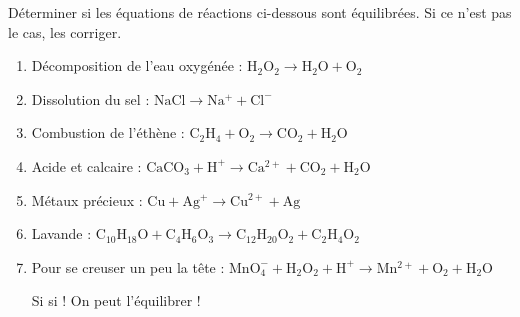 \documentclass[12pt,a4paper,fleqn]{article}
\begin{document}
\normalem %

Déterminer si les équations de réactions ci-dessous sont équilibrées.
Si ce n'est pas le cas, les corriger.

\begin{enumerate}
\item Décomposition de l'eau oxygénée : $ \mathrm{H_2O_2 \rightarrow H_2O + O_2} $
\item Dissolution du sel : $\mathrm{NaCl \rightarrow Na^+ + Cl^-} $
\item Combustion de l'éthène : $\mathrm{C_2H_4 + O_2 \rightarrow CO_2 + H_2O}$
\item Acide et calcaire : $\mathrm{CaCO_3 + H^+ \rightarrow Ca^{2+} + CO_2 + H_2O}$
\item Métaux précieux : $\mathrm{Cu + Ag^+ \rightarrow Cu^{2+} + Ag}$
\item Lavande : $\mathrm{C_{10}H_{18}O + C_4H_6O_3 \rightarrow C_{12}H_{20}O_2 + C_2H_4O_2}$
\item Pour se creuser un peu la tête : $\mathrm{MnO_4^- + H_2O_2 + H^+ \rightarrow Mn^{2+} + O_2 + H_2O}$

Si si ! On peut l'équilibrer !
\end{enumerate}
\end{document}

